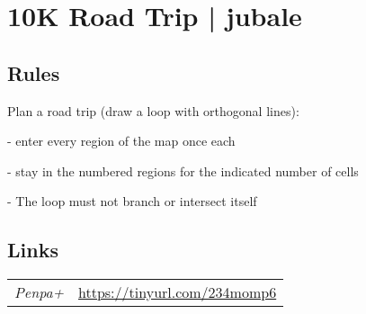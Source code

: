 \section{10K Road Trip | {\normalfont jubale}}
\label{sec:26-10k-road-trip-jubale}

\subsection*{Rules}
\begin{markdown}
Plan a road trip (draw a loop with orthogonal lines):

- enter every region of the map once each

- stay in the numbered regions for the indicated number of cells 

- The loop must not branch or intersect itself
\end{markdown}
\subsection*{Links}
\begin{tabularx}{\textwidth}{l X}
\emph{Penpa+} & \url{https://tinyurl.com/234momp6} \\
\end{tabularx}
\pagebreak
